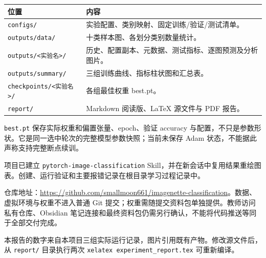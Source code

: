 \documentclass[UTF8,a4paper,zihao=-4,fontset=windows]{ctexart}
\begin{document}
\begin{center}
\small
\begin{tabularx}{\linewidth}{lX}
\toprule
位置 & 内容\\\midrule
\texttt{configs/} & 实验配置、类别映射、固定训练/验证/测试清单。\\
\texttt{outputs/data/} & 十类样本图、各划分类别数量统计。\\
\texttt{outputs/<实验名>/} & 历史、配置副本、元数据、测试指标、逐图预测及分析图片。\\
\texttt{outputs/summary/} & 三组训练曲线、指标柱状图和汇总表。\\
\texttt{checkpoints/<实验名>/} & 各组最佳权重 best.pt。\\
\texttt{report/} & Markdown 阅读版、LaTeX 源文件与 PDF 报告。\\\bottomrule
\end{tabularx}
\end{center}

\texttt{best.pt} 保存实际权重和偏置张量、epoch、验证 accuracy 与配置，不只是参数形状。它是同一选中轮次的完整模型参数快照；当前未保存 Adam 状态，不能据此声称支持完整断点续训。

项目已建立 \texttt{pytorch-image-classification} Skill，并在新会话中复用结果重绘图表。创建、运行验证和主要报错记录在根目录学习过程记录中。

仓库地址：\url{https://github.com/smallmoon661/imagenette-classification}。数据、虚拟环境与权重不进入普通 Git 提交；权重需随提交资料包单独提供。教师访问私有仓库、Obsidian 笔记连接和最终资料包仍需另行确认，不能将代码推送等同于全部交付完成。

本报告的数字来自本项目三组实际运行记录，图片引用既有产物。修改源文件后，从 \texttt{report/} 目录执行两次 \texttt{xelatex experiment\_report.tex} 可重新编译。
\end{document}

